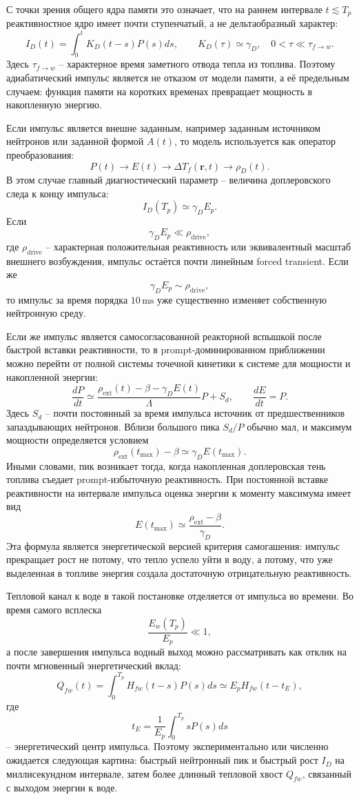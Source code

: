 \documentclass[12pt]{article}
\begin{document}
С точки зрения общего ядра памяти это означает, что на раннем интервале \(t\lesssim T_p\) реактивностное ядро имеет почти ступенчатый, а не дельтаобразный характер:
\[
I_D(t)=\int_0^tK_D(t-s)P(s)ds,
\qquad
K_D(\tau)\simeq \gamma_D,
\quad
0<\tau\ll \tau_{f\to w}.
\]
Здесь \(\tau_{f\to w}\) -- характерное время заметного отвода тепла из топлива. Поэтому адиабатический импульс является не отказом от модели памяти, а её предельным случаем: функция памяти на коротких временах превращает мощность в накопленную энергию.

Если импульс является внешне заданным, например заданным источником нейтронов или заданной формой \(A(t)\), то модель используется как оператор преобразования:
\[
P(t)\longrightarrow E(t)
\longrightarrow \Delta T_f(\mathbf r,t)
\longrightarrow \rho_D(t).
\]
В этом случае главный диагностический параметр -- величина доплеровского следа к концу импульса:
\[
I_D(T_p)\simeq \gamma_D E_p.
\]
Если
\[
\gamma_D E_p\ll \rho_{\mathrm{drive}},
\]
где \(\rho_{\mathrm{drive}}\) -- характерная положительная реактивность или эквивалентный масштаб внешнего возбуждения, импульс остаётся почти линейным forced transient. Если же
\[
\gamma_D E_p\sim \rho_{\mathrm{drive}},
\]
то импульс за время порядка \(10\,\mathrm{ms}\) уже существенно изменяет собственную нейтронную среду.

Если же импульс является самосогласованной реакторной вспышкой после быстрой вставки реактивности, то в prompt-доминированном приближении можно перейти от полной системы точечной кинетики к системе для мощности и накопленной энергии:
\[
\frac{dP}{dt}
\simeq
\frac{\rho_{\mathrm{ext}}(t)-\beta-\gamma_D E(t)}{\Lambda}P
+S_d,
\qquad
\frac{dE}{dt}=P.
\]
Здесь \(S_d\) -- почти постоянный за время импульса источник от предшественников запаздывающих нейтронов. Вблизи большого пика \(S_d/P\) обычно мал, и максимум мощности определяется условием
\[
\rho_{\mathrm{ext}}(t_{\max})-\beta
\simeq
\gamma_D E(t_{\max}).
\]
Иными словами, пик возникает тогда, когда накопленная доплеровская тень топлива съедает prompt-избыточную реактивность. При постоянной вставке реактивности на интервале импульса оценка энергии к моменту максимума имеет вид
\[
E(t_{\max})\simeq
\frac{\rho_{\mathrm{ext}}-\beta}{\gamma_D}.
\]
Эта формула является энергетической версией критерия самогашения: импульс прекращает рост не потому, что тепло успело уйти в воду, а потому, что уже выделенная в топливе энергия создала достаточную отрицательную реактивность.

Тепловой канал к воде в такой постановке отделяется от импульса во времени. Во время самого всплеска
\[
\frac{E_w(T_p)}{E_p}\ll 1,
\]
а после завершения импульса водный выход можно рассматривать как отклик на почти мгновенный энергетический вклад:
\[
Q_{fw}(t)
=
\int_0^{T_p}H_{fw}(t-s)P(s)ds
\simeq
E_p H_{fw}(t-t_E),
\]
где
\[
t_E=\frac{1}{E_p}\int_0^{T_p}sP(s)ds
\]
-- энергетический центр импульса. Поэтому экспериментально или численно ожидается следующая картина: быстрый нейтронный пик и быстрый рост \(I_D\) на миллисекундном интервале, затем более длинный тепловой хвост \(Q_{fw}\), связанный с выходом энергии к воде.
\end{document}
